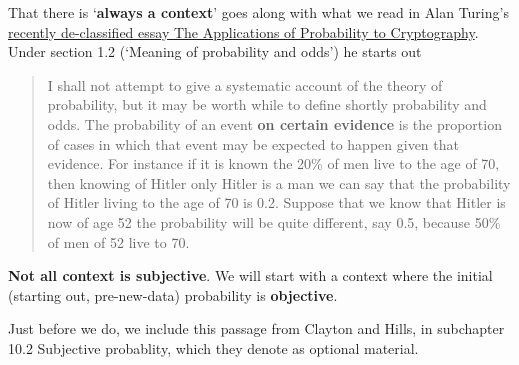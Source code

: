 \documentclass[]{book}
\begin{document}
That there is `\textbf{always a context}' goes along with what we read in Alan Turing's \href{http://www.medicine.mcgill.ca/epidemiology/hanley/bios601/CandH-ch0102/TuringProbability.pdf}{recently de-classified essay The Applications of Probability to Cryptography}. Under section 1.2 (`Meaning of probability and odds') he starts out

\begin{quote}
I shall not attempt to give a systematic account of the theory of probability, but it may be worth while to define shortly probability and odds. The probability of an event \textbf{on certain evidence} is the proportion of cases in which that event may be expected to happen given that evidence. For instance if it is known the 20\% of men live to the age of 70, then knowing of Hitler only Hitler is a man we can say that the probability of Hitler living to the age of 70 is 0.2. Suppose that we know that Hitler is now of age 52 the probability will be quite different, say 0.5, because 50\% of men of 52 live to 70.
\end{quote}

\textbf{Not all context is subjective}. We will start with a context where the initial (starting out, pre-new-data) probability is \textbf{objective}.

Just before we do, we include this passage from Clayton and Hills, in subchapter 10.2 Subjective probablity, which they denote as optional material.
\end{document}
